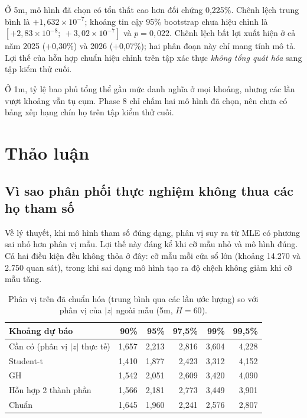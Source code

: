 \documentclass[11pt,a4paper]{article}
\begin{document}
Ở 5m, mô hình đã chọn có tổn thất cao hơn đối chứng 0,225\%. Chênh lệch trung bình là $+1{,}632\times10^{-7}$; khoảng tin cậy 95\% bootstrap chưa hiệu chỉnh là $[+2{,}83\times10^{-8};\ +3{,}02\times10^{-7}]$ và $p=0{,}022$. Chênh lệch bất lợi xuất hiện ở cả năm 2025 (+0,30\%) và 2026 (+0,07\%); hai phân đoạn này chỉ mang tính mô tả. Lợi thế của hỗn hợp chuẩn hiệu chỉnh trên tập xác thực \emph{không tổng quát hóa} sang tập kiểm thử cuối.

Ở 1m, tỷ lệ bao phủ tổng thể gần mức danh nghĩa ở mọi khoảng, nhưng các lần vượt khoảng vẫn tụ cụm. Phase 8 chỉ chấm hai mô hình đã chọn, nên chưa có bảng xếp hạng chín họ trên tập kiểm thử cuối.

\section{Thảo luận}

\subsection{Vì sao phân phối thực nghiệm không thua các họ tham số}

Về lý thuyết, khi mô hình tham số đúng dạng, phân vị suy ra từ MLE có phương sai nhỏ hơn phân vị mẫu. Lợi thế này đáng kể khi cỡ mẫu nhỏ và mô hình đúng. Cả hai điều kiện đều không thỏa ở đây: cỡ mẫu mỗi cửa sổ lớn (khoảng 14.270 và 2.750 quan sát), trong khi sai dạng mô hình tạo ra độ chệch không giảm khi cỡ mẫu tăng.

\begin{table}[h]
\centering
\small
\caption{Phân vị trên đã chuẩn hóa (trung bình qua các lần ước lượng) so với phân vị của $|z|$ ngoài mẫu (5m, $H=60$).}
\begin{tabular}{lrrrrr}
\toprule
Khoảng dự báo & 90\% & 95\% & 97,5\% & 99\% & 99,5\% \\
\midrule
Cần có (phân vị $|z|$ thực tế) & 1,657 & 2,213 & 2,816 & 3,604 & 4,228 \\
Student-t & 1,410 & 1,877 & 2,423 & 3,312 & 4,152 \\
GH & 1,542 & 2,051 & 2,609 & 3,420 & 4,090 \\
Hỗn hợp 2 thành phần & 1,566 & 2,181 & 2,773 & 3,449 & 3,901 \\
Chuẩn & 1,645 & 1,960 & 2,241 & 2,576 & 2,807 \\
\bottomrule
\end{tabular}
\end{table}
\end{document}
